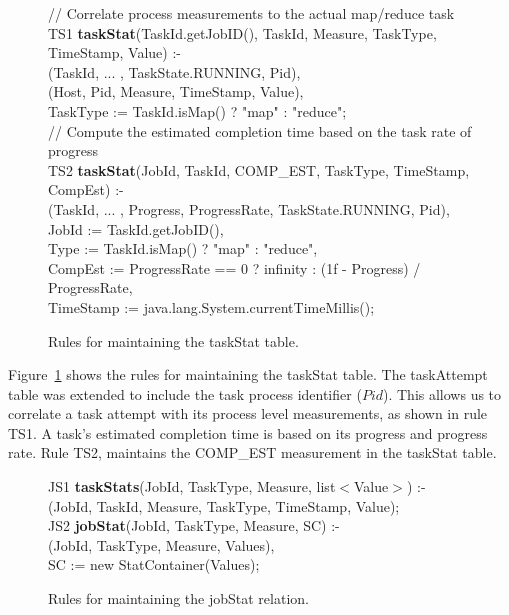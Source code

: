\begin{figure}
\ssp
\centering
\begin{boxedminipage}{\linewidth}

// Correlate process measurements to the actual map/reduce task \\
TS1 {\bf taskStat}(TaskId.getJobID(), TaskId, Measure, TaskType, TimeStamp, Value) :- \\
(TaskId, ... , TaskState.RUNNING, Pid), \\
(Host, Pid, Measure, TimeStamp, Value), \\
\datalogspace TaskType := TaskId.isMap() ? "map" : "reduce"; \\
        
// Compute the estimated completion time based on the task rate of progress \\
TS2 {\bf taskStat}(JobId, TaskId, COMP\_EST, TaskType, TimeStamp, CompEst) :- \\
(TaskId, ... , Progress, ProgressRate, TaskState.RUNNING, Pid), \\
\datalogspace JobId := TaskId.getJobID(), \\
\datalogspace Type := TaskId.isMap() ? "map" : "reduce", \\
\datalogspace CompEst := ProgressRate == 0 ? infinity : (1f - Progress) / ProgressRate, \\
\datalogspace TimeStamp := java.lang.System.currentTimeMillis(); \\

\end{boxedminipage}
\caption{\label{ch:hop:fig:taskstat} Rules for maintaining the taskStat table.}
\end{figure}

Figure~\ref{ch:hop:fig:taskstat} shows the rules for maintaining the taskStat table. The taskAttempt
table was extended to include the task process identifier ($Pid$). This allows us to correlate 
a task attempt with its process level measurements, as shown in rule TS1. A task's estimated
completion time is based on its progress and progress rate. Rule TS2, maintains the COMP\_EST
measurement in the taskStat table. 

\begin{figure}
\ssp
\centering
\begin{boxedminipage}{\linewidth}
JS1 {\bf taskStats}(JobId, TaskType, Measure, list$<$Value$>$) :- \\
(JobId, TaskId, Measure, TaskType, TimeStamp, Value); \\

        
JS2 {\bf jobStat}(JobId, TaskType, Measure, SC) :- \\
(JobId, TaskType, Measure, Values), \\
\datalogspace SC := new StatContainer(Values); \\ 
        
\end{boxedminipage}
\caption{\label{ch:hop:fig:jobstat} Rules for maintaining the jobStat relation.}
\end{figure}

